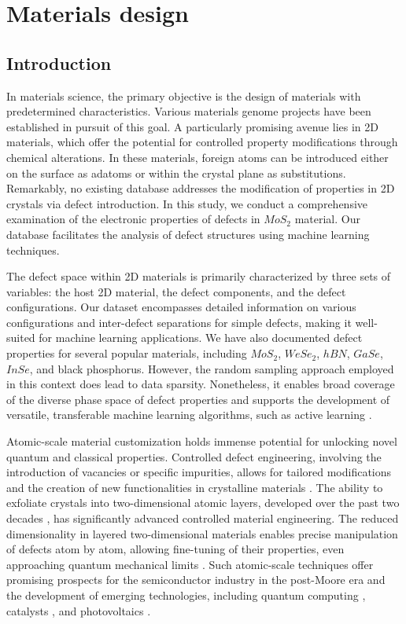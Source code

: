 
\section{Materials design}
\subsection{Introduction}
    In materials science, the primary objective is the design of materials with predetermined characteristics. Various materials genome projects have been established in pursuit of this goal. A particularly promising avenue lies in 2D materials, which offer the potential for controlled property modifications through chemical alterations. In these materials, foreign atoms can be introduced either on the surface as adatoms or within the crystal plane as substitutions. Remarkably, no existing database addresses the modification of properties in 2D crystals via defect introduction. In this study, we conduct a comprehensive examination of the electronic properties of defects in $MoS_2$ material. Our database facilitates the analysis of defect structures using machine learning techniques.
    
    
    The defect space within 2D materials is primarily characterized by three sets of variables: the host 2D material, the defect components, and the defect configurations. Our dataset encompasses detailed information on various configurations and inter-defect separations for simple defects, making it well-suited for machine learning applications. We have also documented defect properties for several popular materials, including $MoS_2$, $WeSe_2$, $hBN$, $GaSe$, $InSe$, and black phosphorus. However, the random sampling approach employed in this context does lead to data sparsity. Nonetheless, it enables broad coverage of the diverse phase space of defect properties and supports the development of versatile, transferable machine learning algorithms, such as active learning \cite{murray2022addressing}.
    
    

    Atomic-scale material customization holds immense potential for unlocking novel quantum and classical properties. Controlled defect engineering, involving the introduction of vacancies or specific impurities, allows for tailored modifications and the creation of new functionalities in crystalline materials \cite{lin2021controllable}. The ability to exfoliate crystals into two-dimensional atomic layers, developed over the past two decades \cite{kostya2005}, has significantly advanced controlled material engineering. The reduced dimensionality in layered two-dimensional materials enables precise manipulation of defects atom by atom, allowing fine-tuning of their properties, even approaching quantum mechanical limits \cite{spe2016}. Such atomic-scale techniques offer promising prospects for the semiconductor industry in the post-Moore era and the development of emerging technologies, including quantum computing \cite{frey2020machine}, catalysts \cite{chanussot2021open}, and photovoltaics \cite{wang2019novel}.
    
